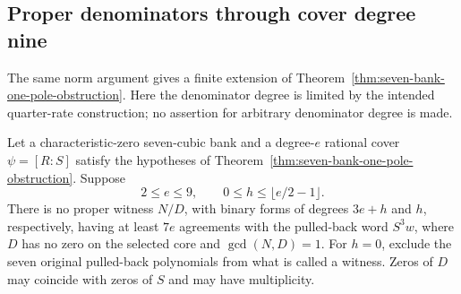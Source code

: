 \subsection{Proper denominators through cover degree nine}
\label{sec:small-cover-quarter-obstruction}

The same norm argument gives a finite extension of
Theorem~\ref{thm:seven-bank-one-pole-obstruction}.
Here the denominator degree is limited by the intended quarter-rate
construction; no assertion for arbitrary denominator degree is made.

\begin{corollary}\label{cor:small-cover-quarter-obstruction}
Let a characteristic-zero seven-cubic bank and a degree-$e$ rational cover
$\psi=[R:S]$ satisfy the hypotheses of
Theorem~\ref{thm:seven-bank-one-pole-obstruction}.  Suppose
\[
 2\le e\le9,\qquad 0\le h\le\lfloor e/2-1\rfloor.
\]
There is no proper witness $N/D$, with binary forms of degrees
$3e+h$ and $h$, respectively, having at least $7e$ agreements with
the pulled-back word $S^3w$, where $D$ has no zero on the selected
core and $\gcd(N,D)=1$.
For $h=0$, exclude the seven original pulled-back polynomials from
what is called a witness.
Zeros of $D$ may coincide with zeros of $S$ and may have multiplicity.
\end{corollary}

